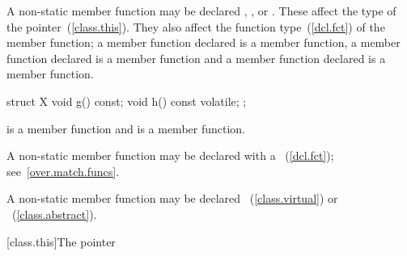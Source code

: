 \pnum
A non-static member function may be declared ,
, or  . These
 affect the type of the 
pointer~(\ref{class.this}). They also affect the function
type~(\ref{dcl.fct}) of the member function; a member function declared
 is a  member function, a member function
declared  is a  member function and a
member function declared   is a
 member function.
\begin{example}

\begin{codeblock}
struct X {
  void g() const;
  void h() const volatile;
};
\end{codeblock}

 is a  member function and  is a
  member function.
\end{example}

\pnum
A non-static member function may be declared with a ~(\ref{dcl.fct}); see~\ref{over.match.funcs}.

\pnum
A non-static member function may be declared
~(\ref{class.virtual}) or ~(\ref{class.abstract}).

[class.this]{The  pointer}%

